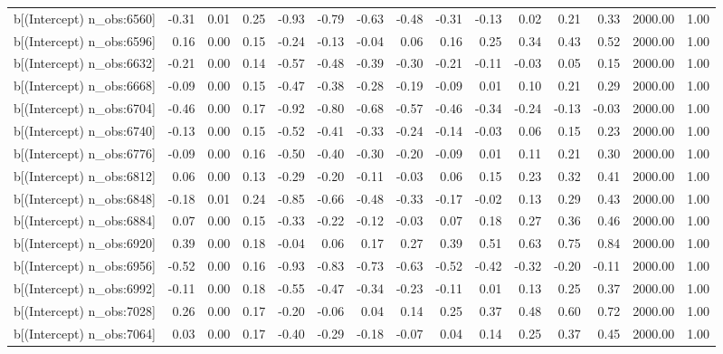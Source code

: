 \begin{table}[ht]
\begin{tabular}{rrrrrrrrrrrrrrr}
  b[(Intercept) n\_obs:6560] & -0.31 & 0.01 & 0.25 & -0.93 & -0.79 & -0.63 & -0.48 & -0.31 & -0.13 & 0.02 & 0.21 & 0.33 & 2000.00 & 1.00 \\ 
  b[(Intercept) n\_obs:6596] & 0.16 & 0.00 & 0.15 & -0.24 & -0.13 & -0.04 & 0.06 & 0.16 & 0.25 & 0.34 & 0.43 & 0.52 & 2000.00 & 1.00 \\ 
  b[(Intercept) n\_obs:6632] & -0.21 & 0.00 & 0.14 & -0.57 & -0.48 & -0.39 & -0.30 & -0.21 & -0.11 & -0.03 & 0.05 & 0.15 & 2000.00 & 1.00 \\ 
  b[(Intercept) n\_obs:6668] & -0.09 & 0.00 & 0.15 & -0.47 & -0.38 & -0.28 & -0.19 & -0.09 & 0.01 & 0.10 & 0.21 & 0.29 & 2000.00 & 1.00 \\ 
  b[(Intercept) n\_obs:6704] & -0.46 & 0.00 & 0.17 & -0.92 & -0.80 & -0.68 & -0.57 & -0.46 & -0.34 & -0.24 & -0.13 & -0.03 & 2000.00 & 1.00 \\ 
  b[(Intercept) n\_obs:6740] & -0.13 & 0.00 & 0.15 & -0.52 & -0.41 & -0.33 & -0.24 & -0.14 & -0.03 & 0.06 & 0.15 & 0.23 & 2000.00 & 1.00 \\ 
  b[(Intercept) n\_obs:6776] & -0.09 & 0.00 & 0.16 & -0.50 & -0.40 & -0.30 & -0.20 & -0.09 & 0.01 & 0.11 & 0.21 & 0.30 & 2000.00 & 1.00 \\ 
  b[(Intercept) n\_obs:6812] & 0.06 & 0.00 & 0.13 & -0.29 & -0.20 & -0.11 & -0.03 & 0.06 & 0.15 & 0.23 & 0.32 & 0.41 & 2000.00 & 1.00 \\ 
  b[(Intercept) n\_obs:6848] & -0.18 & 0.01 & 0.24 & -0.85 & -0.66 & -0.48 & -0.33 & -0.17 & -0.02 & 0.13 & 0.29 & 0.43 & 2000.00 & 1.00 \\ 
  b[(Intercept) n\_obs:6884] & 0.07 & 0.00 & 0.15 & -0.33 & -0.22 & -0.12 & -0.03 & 0.07 & 0.18 & 0.27 & 0.36 & 0.46 & 2000.00 & 1.00 \\ 
  b[(Intercept) n\_obs:6920] & 0.39 & 0.00 & 0.18 & -0.04 & 0.06 & 0.17 & 0.27 & 0.39 & 0.51 & 0.63 & 0.75 & 0.84 & 2000.00 & 1.00 \\ 
  b[(Intercept) n\_obs:6956] & -0.52 & 0.00 & 0.16 & -0.93 & -0.83 & -0.73 & -0.63 & -0.52 & -0.42 & -0.32 & -0.20 & -0.11 & 2000.00 & 1.00 \\ 
  b[(Intercept) n\_obs:6992] & -0.11 & 0.00 & 0.18 & -0.55 & -0.47 & -0.34 & -0.23 & -0.11 & 0.01 & 0.13 & 0.25 & 0.37 & 2000.00 & 1.00 \\ 
  b[(Intercept) n\_obs:7028] & 0.26 & 0.00 & 0.17 & -0.20 & -0.06 & 0.04 & 0.14 & 0.25 & 0.37 & 0.48 & 0.60 & 0.72 & 2000.00 & 1.00 \\ 
  b[(Intercept) n\_obs:7064] & 0.03 & 0.00 & 0.17 & -0.40 & -0.29 & -0.18 & -0.07 & 0.04 & 0.14 & 0.25 & 0.37 & 0.45 & 2000.00 & 1.00 \\ 

\end{tabular}
\end{table}

